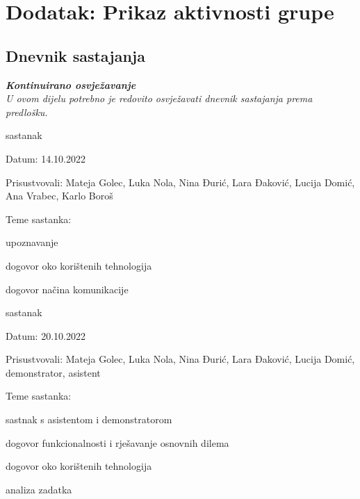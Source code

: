 \chapter*{Dodatak: Prikaz aktivnosti grupe}
		
		\section*{Dnevnik sastajanja}
		
		\textbf{\textit{Kontinuirano osvježavanje}}\\
		
		 \textit{U ovom dijelu potrebno je redovito osvježavati dnevnik sastajanja prema predlošku.}
		
		\begin{packed_enum}
			\item  sastanak
			
			\item[] \begin{packed_item}
				\item Datum: 14.10.2022 
				\item Prisustvovali: Mateja Golec, Luka Nola, Nina Đurić, Lara Đaković, Lucija Domić, Ana Vrabec, Karlo Boroš
				\item Teme sastanka: 
				\begin{packed_item}
					\item  upoznavanje
					\item  dogovor oko korištenih tehnologija
					\item  dogovor načina komunikacije
				\end{packed_item}
			\end{packed_item}
			

			\item  sastanak
			
			\item[] \begin{packed_item}
				\item Datum: 20.10.2022 
				\item Prisustvovali: Mateja Golec, Luka Nola, Nina Đurić, Lara Đaković, Lucija Domić, demonstrator, asistent
				\item Teme sastanka:
				\begin{packed_item}
					\item  sastnak s asistentom i demonstratorom
					\item  dogovor funkcionalnosti i rješavanje osnovnih dilema
					\item  dogovor oko korištenih tehnologija
					\item  analiza zadatka
				\end{packed_item}
			\end{packed_item}
			

\end{packed_enum}
